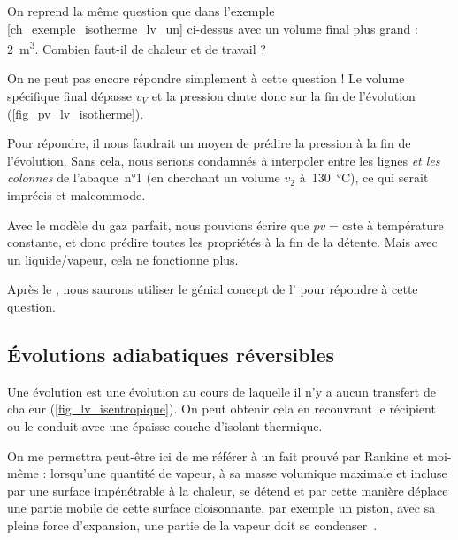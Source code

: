 			
			\begin{anexample}
				\label{ch_exemple_isotherme_lv_deux}
			
			On reprend la même question que dans l’exemple \ref{ch_exemple_isotherme_lv_un} ci-dessus avec un volume final plus grand : \SI{2}{\metre\cubed}. Combien faut-il de chaleur et de travail ?
					
				\begin{answer}
				On ne peut pas encore répondre simplement à cette question ! Le volume spécifique final dépasse $v_V$ et la pression chute donc sur la fin de l’évolution (\cref{fig_pv_lv_isotherme}).
				
				Pour répondre, il nous faudrait un moyen de prédire la pression à la fin de l’évolution. Sans cela, nous serions condamnés à interpoler entre les lignes \emph{et les colonnes} de l’abaque~n°1 (en cherchant un volume $v_2$ à~\SI{130}{\degreeCelsius}), ce qui serait imprécis et malcommode.
				
				\begin{remark}Avec le modèle du gaz parfait, nous pouvions écrire que $p v = \text{cste}$ à température constante, et donc prédire toutes les propriétés à la fin de la détente. Mais avec un liquide/vapeur, cela ne fonctionne plus.\end{remark}
				\begin{remark}Après le \courshuitshort, nous saurons utiliser le génial concept de l’ pour répondre à cette question.\end{remark}\end{answer}
			\end{anexample}




	\subsection{Évolutions adiabatiques réversibles}
		\label{ch_lv_isentropiques}

		Une évolution  est une évolution au cours de laquelle il n’y a aucun transfert de chaleur (\cref{fig_lv_isentropique}). On peut obtenir cela en recouvrant le récipient ou le conduit avec une épaisse couche d’isolant thermique.
		
		On me permettra peut-être ici de me référer à un fait prouvé par Rankine et moi-même : lorsqu’une quantité de vapeur, à sa masse volumique maximale et incluse par une surface impénétrable à la chaleur, se détend et par cette manière déplace une partie mobile de cette surface cloisonnante, par exemple un piston, avec sa pleine force d’expansion, une partie de la vapeur doit se condenser~\jecourte.

